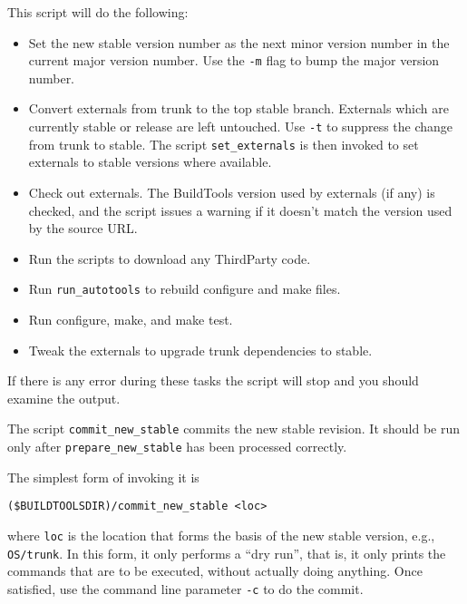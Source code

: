 This script will do the following:

\begin{itemize}
  \item Set the new stable version number as the next minor version number in
    the current major version number. Use the {\tt -m} flag to bump the major
    version number.

  \item Convert externals from trunk to the top stable branch. Externals which
    are currently stable or release are left untouched. Use {\tt -t} to suppress
    the change from trunk to stable. The script {\tt set\_externals} is then invoked to set
    externals to stable versions where available.

  \item Check out externals. The BuildTools version used by externals (if any)
    is checked, and the script issues a warning if it doesn't match the
    version used by the source URL.

 \item Run the scripts to download any ThirdParty code.

  \item Run {\tt run\_autotools} to rebuild configure and make files.

  \item Run configure, make, and make test.

  \item Tweak the externals to upgrade trunk  dependencies to stable.
\end{itemize}

If there is any error during these tasks the script will stop and you should
examine the output.
   
\medskip

The script {\tt commit\_new\_stable} commits the new stable revision. It should be run only after 
{\tt prepare\_new\_stable} has been processed correctly.  

The simplest form of invoking it is

\begin{verbatim}
($BUILDTOOLSDIR)/commit_new_stable <loc>
\end{verbatim}

\noindent
where {\tt loc} is the location that forms the basis of the new stable version, e.g., {\tt OS/trunk}. In this form, it only performs a ``dry run'', that is, it only prints the commands that are to be executed, without actually doing anything. Once satisfied, use the command line parameter {\tt -c} to do the commit.

